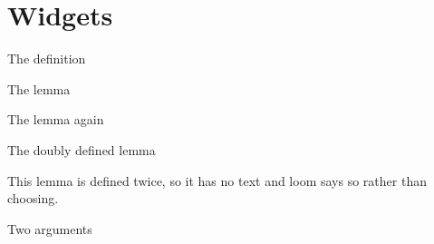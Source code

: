 \section{Widgets}\label{sy-0400}

\begin{frame}{The definition}

\end{frame}

\begin{frame}{The lemma}

\end{frame}

\begin{frame}{The lemma again}

\end{frame}

\begin{frame}{The doubly defined lemma}
\begin{lemma}\label{sy-999E}
This lemma is defined twice, so it has no text and loom says so rather than choosing.
\end{lemma}
\end{frame}

\begin{frame}{Two arguments}

\end{frame}

